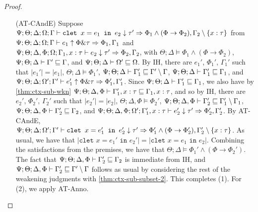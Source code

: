 \begin{proof}
\begin{itemize}
  \item[(AT-CAndE)] Suppose
  $\Psi ; \Theta ; \Delta ; \Omega ; \Gamma \vdash \texttt{clet } x = e_1 \texttt{ in } e_2 \downarrow \tau' \Rightarrow \Phi_1 \wedge (\Phi \to \Phi_2),\Gamma_2 \setminus \{x : \tau\}$ from
  $\Psi ; \Theta ; \Delta ; \Omega ; \Gamma \vdash e_1 \uparrow \Phi \& \tau \Rightarrow \Phi_1,\Gamma_1$ and
  $\Psi ; \Theta ; \Delta, \Phi ; \Omega ; \Gamma_1, x : \tau \vdash e_2 \downarrow \tau' \Rightarrow \Phi_2, \Gamma_2$, with
  $\Theta ; \Delta \vDash \Phi_1 \wedge (\Phi \to \Phi_2)$,
  $\Psi ; \Theta ; \Delta \vdash \Gamma' \sqsubseteq \Gamma$, and
  $\Psi ; \Theta ; \Delta \vdash \Omega' \sqsubseteq \Omega$.
  By IH, there are $e_1'$, $\Phi_1'$, $\Gamma_1'$ such that
  $|e_1'| = |e_1|$,
  $\Theta ; \Delta \vDash \Phi_1'$,
  $\Psi ; \Theta ; \Delta \vdash \Gamma_1' \sqsubseteq \Gamma' \setminus \Gamma$,
  $\Psi ; \Theta ; \Delta \vdash \Gamma_1' \sqsubseteq \Gamma_1$, and
  $\Psi ; \Theta ; \Delta ; \Omega' ; \Gamma' \vdash e_1' \uparrow \Phi \& \tau \Rightarrow \Phi_1',\Gamma_1'$.
  Since $\Psi ; \Theta ; \Delta \vdash \Gamma_1' \sqsubseteq \Gamma_1$, we also have by \autoref{thm:ctx-sub-wkn}
  $\Psi ; \Theta ; \Delta, \Phi \vdash \Gamma_1', x : \tau \sqsubseteq \Gamma_1, x : \tau$,
  and so by IH, there are $e_2'$, $\Phi_2'$, $\Gamma_2'$ such that
  $|e_2'| = |e_2|$,
  $\Theta ; \Delta, \Phi \vDash \Phi_2'$,
  $\Psi ; \Theta ; \Delta, \Phi \vdash \Gamma_2' \sqsubseteq \Gamma_1' \setminus \Gamma_1$,
  $\Psi ; \Theta ; \Delta, \Phi \vdash \Gamma_2' \sqsubseteq \Gamma_2$, and
  $\Psi ; \Theta ; \Delta, \Phi ; \Omega' ; \Gamma_1', x : \tau \vdash e_2' \downarrow \tau' \Rightarrow \Phi_2', \Gamma_2'$.
  By AT-CAndE,
  $\Psi ; \Theta ; \Delta ; \Omega' ; \Gamma' \vdash \texttt{clet } x = e_1' \texttt{ in } e_2' \downarrow \tau' \Rightarrow \Phi_1' \wedge (\Phi \to \Phi_2'),\Gamma_2' \setminus \{x : \tau\}$.
  As usual, we have that $|\texttt{clet } x = e_1' \texttt{ in } e_2'| = |\texttt{clet } x = e_1 \texttt{ in } e_2|$.
  Combining the satisfactions from the premises, we have that $\Theta ; \Delta \vDash \Phi_1' \wedge (\Phi \to \Phi_2')$.
  The fact that $\Psi ; \Theta ; \Delta, \Phi \vdash \Gamma_2' \sqsubseteq \Gamma_2$ is immediate from IH, 
  and $\Psi ; \Theta ; \Delta, \Phi \vdash \Gamma_2' \sqsubseteq \Gamma' \setminus \Gamma$ follows as usual by considering the rest
  of the weakening judgments with \autoref{thm:ctx-sub-subset-2}. This completes (1). For (2), we apply AT-Anno.
   

\end{itemize}
\end{proof}
